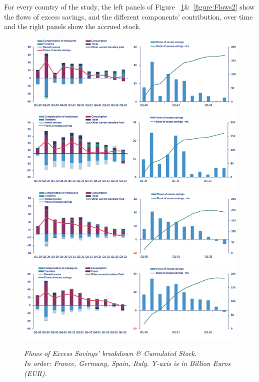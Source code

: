 For every country of the study, the left panels of Figure ~\ref{figure:Flows1}\&~\ref{figure:Flows2} show the flows of excess savings, and the different components' contribution, over time and the right panels show the accrued stock.

\begin{figure}[H]
    \centering
    \caption{\textit{Flows of Excess Savings’ breakdown \& Cumulated Stock. \\ In order: France, Germany, Spain, Italy. Y-axis is in Billion Euros (EUR).}}
    \includegraphics[width=.9\textwidth]{Core/1.Savings/img/xFrance.png}
    \includegraphics[width=.9\textwidth]{Core/1.Savings/img/xGermany.png}
    \includegraphics[width=.9\textwidth]{Core/1.Savings/img/xSpain.png}
    \includegraphics[width=.9\textwidth]{Core/1.Savings/img/xItaly.png}
    \label{figure:Flows1}
\end{figure}

